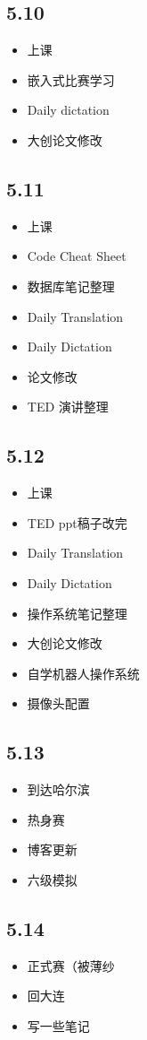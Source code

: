 \documentclass[UTF8]{ctexart}
\begin{document}
\subsection*{5.10}
\begin{itemize}
    \item 上课
    \item 嵌入式比赛学习
    \item Daily dictation
    \item 大创论文修改
\end{itemize}
\subsection*{5.11}
\begin{itemize}
    \item 上课
    \item Code Cheat Sheet
    \item 数据库笔记整理
    \item Daily Translation
    \item Daily Dictation
    \item 论文修改
    \item TED 演讲整理
\end{itemize}
\subsection*{5.12}
\begin{itemize}
    \item 上课
    \item TED ppt稿子改完
    \item Daily Translation
    \item Daily Dictation
    \item 操作系统笔记整理
    \item 大创论文修改
    \item 自学机器人操作系统
    \item 摄像头配置
\end{itemize}
\subsection*{5.13}
\begin{itemize}
    \item 到达哈尔滨
    \item 热身赛
    \item 博客更新
    \item 六级模拟
\end{itemize}
\subsection*{5.14}
\begin{itemize}
    \item 正式赛（被薄纱
    \item 回大连
    \item 写一些笔记
\end{itemize}
\end{document}
